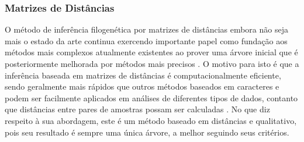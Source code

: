 \documentclass[english,brazilian]{UNISINOSmonografia} %
\begin{document}
%
%
%
%


\subsubsection{Matrizes de Distâncias}


O método de inferência filogenética por matrizes de distâncias embora não seja mais o estado da arte continua exercendo importante papel como fundação aos métodos mais complexos atualmente existentes ao prover uma árvore inicial que é posteriormente melhorada por métodos mais precisos \cite{Guindon2003,Vinh2004}.
O motivo para isto é que a inferência baseada em matrizes de distâncias é computacionalmente eficiente, sendo geralmente mais rápidos que outros métodos baseados em caracteres e podem ser facilmente aplicados em análises de diferentes tipos de dados, contanto que distâncias entre pares de amostras possam ser calculadas \cite{yang2014molecular}.
No que diz respeito à sua abordagem, este é um método baseado em distâncias e qualitativo, pois seu resultado é sempre uma única árvore, a melhor seguindo seus critérios.
\end{document}
